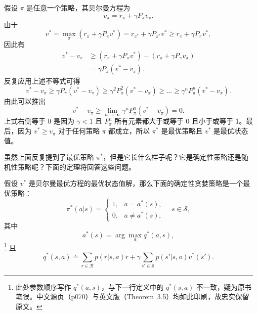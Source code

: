 \begin{derivation}
\label{box:rl-optimality-proof}
假设 $\pi$ 是任意一个策略，其贝尔曼方程为
\begin{equation}
  v_\pi = r_\pi + \gamma P_\pi v_\pi.
\end{equation}
由于
\begin{equation}
  v^* = \max_\pi (r_\pi + \gamma P_\pi v^*) = r_{\pi^*} + \gamma P_{\pi^*} v^* \geqslant r_\pi + \gamma P_\pi v^*,
\end{equation}
因此有
\begin{equation}
\begin{aligned}
  v^* - v_\pi &\geqslant (r_\pi + \gamma P_\pi v^*) - (r_\pi + \gamma P_\pi v_\pi)\\
  &= \gamma P_\pi (v^* - v_\pi).
\end{aligned}
\end{equation}
反复应用上述不等式可得
\begin{equation}
  v^* - v_\pi \geqslant \gamma P_\pi (v^* - v_\pi) \geqslant \gamma^2 P_\pi^2 (v^* - v_\pi) \geqslant \dots \geqslant \gamma^n P_\pi^n (v^* - v_\pi).
\end{equation}
由此可以推出
\begin{equation}
  v^* - v_\pi \geqslant \lim_{n \to \infty} \gamma^n P_\pi^n (v^* - v_\pi) = 0.
\end{equation}
上式右侧等于 0 是因为 $\gamma < 1$ 且 $P_\pi^n$ 所有元素都大于或等于 0 且小于或等于 1。最后，因为 $v^* \geqslant v_\pi$ 对于任何策略 $\pi$ 都成立，所以 $\pi^*$ 是最优策略且 $v^*$ 是最优状态值。
\end{derivation}

虽然上面反复提到了最优策略 $\pi^*$，但是它长什么样子呢？它是确定性策略还是随机性策略呢？下面的定理将回答这些问题。

\begin{theorem}[贪婪最优策略]
\label{thm:rl-greedy-policy}
假设 $v^*$ 是贝尔曼最优方程的最优状态值解，那么下面的确定性贪婪策略是一个最优策略：
\begin{equation}
  \pi^*(a|s) = \begin{cases} 1, & a = a^*(s),\\ 0, & a \neq a^*(s), \end{cases} \quad s \in \mathcal{S},
\label{eq:rl-greedy-policy}
\end{equation}
其中
\begin{equation}
  a^*(s) = \arg\max_a q^*(a, s),
\end{equation}
\footnote{此处参数顺序写作 $q^*(a,s)$，与下一行定义中的 $q^*(s,a)$ 不一致，疑为原书笔误。中文源页（p070）与英文版（Theorem~3.5）均如此印刷，故忠实保留原文。}
且
\begin{equation}
  q^*(s, a) \doteq \sum_{r \in \mathcal{R}} p(r|s,a) r + \gamma \sum_{s' \in \mathcal{S}} p(s'|s,a) v^*(s').
\end{equation}
\end{theorem}

